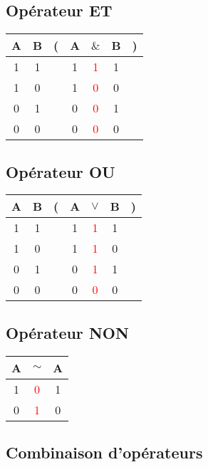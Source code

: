 \documentclass[12pt,a4paper]{article}
\begin{document}
	\subsection{Opérateur \textbf{ET}}
	
	\begin{tabular}{@{ }c@{ }@{ }c | c@{}@{ }c@{ }@{ }c@{ }@{ }c@{ }@{}c@{ }}
		A & B & ( & A & $\&$ & B & )\\
		\hline 
		1 & 1 &  & 1 & \textcolor{red}{1} & 1 & \\
		1 & 0 &  & 1 & \textcolor{red}{0} & 0 & \\
		0 & 1 &  & 0 & \textcolor{red}{0} & 1 & \\
		0 & 0 &  & 0 & \textcolor{red}{0} & 0 & \\
	\end{tabular}

	\subsection{Opérateur \textbf{OU}}
	
	\begin{tabular}{@{ }c@{ }@{ }c | c@{}@{ }c@{ }@{ }c@{ }@{ }c@{ }@{}c@{ }}
		A & B & ( & A & $\lor$ & B & )\\
		\hline 
		1 & 1 &  & 1 & \textcolor{red}{1} & 1 & \\
		1 & 0 &  & 1 & \textcolor{red}{1} & 0 & \\
		0 & 1 &  & 0 & \textcolor{red}{1} & 1 & \\
		0 & 0 &  & 0 & \textcolor{red}{0} & 0 & \\
	\end{tabular}

	\subsection{Opérateur \textbf{NON}}
	
	\begin{tabular}{@{ }c | c@{ }@{ }c}
		A & $\sim$ & A\\
		\hline 
		1 & \textcolor{red}{0} & 1\\
		0 & \textcolor{red}{1} & 0\\
	\end{tabular}

	\subsection{Combinaison d'opérateurs}
	
\end{document}
